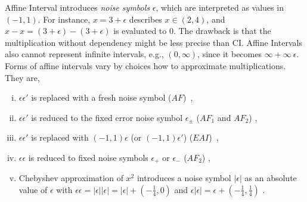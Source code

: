 \documentclass[runningheads,a4paper,oribibl]{llncs}
\newcommand{\suppress}[1]{} %
\begin{document}
Affine Interval introduces \emph{noise symbols} $\epsilon$, 
which are interpreted as values in $(-1,1)$. 
For instance, $x = 3 + \epsilon$ describes $x \in (2,4)$, and 
$x - x = (3 + \epsilon) - (3 + \epsilon)$ is evaluated to $0$. 
The drawback is that the multiplication without dependency might be less precise than CI.
Affine Intervals also cannot represent infinite intervals, e.g., $(0,\infty)$, 
since it becomes $\infty + \infty~\epsilon$. 
Forms of affine intervals vary by choices how to approximate multiplications. They are,
\begin{enumerate}[(i)]
\item $\epsilon \epsilon'$ is replaced with a fresh noise symbol 
($AF$)~\cite{Comba93affinearithmetic}, 
\item $\epsilon \epsilon'$ is reduced to the fixed error noise symbol 
$\epsilon_{\pm}$ ($AF_1$ and $AF_2$) \cite{Messine_extensionsof},
\item $\epsilon \epsilon'$ is replaced with $(-1,1) \epsilon$ 
(or $(-1,1) \epsilon'$) ($EAI$)~\cite{Ngoc:2009:ORE:1685167.1685421},
\item $\epsilon \epsilon$ is reduced to fixed noise symbols 
$\epsilon_+$ or $\epsilon_{-}$ ($AF_2$) \cite{Messine_extensionsof}, 
\item Chebyshev approximation of $x^2$ introduces a noise symbol $|\epsilon|$ 
as an absolute value of $\epsilon$ with 
$\epsilon \epsilon = |\epsilon| |\epsilon| = |\epsilon| + (-\frac{1}{4}, 0)$ and
$\epsilon |\epsilon| = \epsilon + (-\frac{1}{4}, \frac{1}{4})$ \cite{VanKhanh201227}. 
\end{enumerate} 

\suppress{
\begin{remark}
For Affine intervals, \emph{sensitivity}~\cite{ngocsefm} of a variable
is a possible range of the absolute value of the coefficient of its corresponding $\epsilon$. 


Note that Affine interval works only for bounded intervals. 
For instance, $\infty + \infty \epsilon$ represents $(-\infty,\infty)$, which says nothing. 
Narrowing intervals as an incremental search (Section~\ref{sec:incsearch})
partilly depends on this fact. 
That is, if $\pm \infty$ is contained in an interval, first give finite upper/lower bounds and
search within these bounds using an Affine interval.
If UNSAT is concluded, then enlarge to the whole intervals using CI. 
\end{remark}
}
\end{document}
